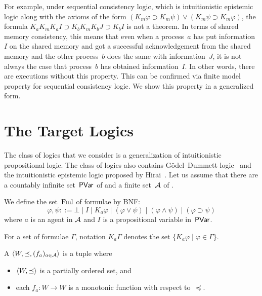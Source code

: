  For example,
 under {sequential consistency logic}, which is intuitionistic epistemic
 logic along with the axioms of the form
 $(K_m\varphi\supset K_m\psi) \vee (K_m\psi\supset K_m\varphi)$,
 the formula $K_aK_mK_aI \supset K_bK_mK_bJ\supset K_bI$ is not a
 theorem.
 In terms of shared memory consistency, this means that even when a
 process~$a$ has put information~$I$ on the shared memory and got a
 successful acknowledgement from the shared memory and the other
 process~$b$ does the same with information~$J$, it is not always the
 case that process~$b$ has obtained information~$I$\kern -2pt.
 In other words, there are executions without this property.
 This can be confirmed via
 finite model property for sequential consistency logic.
 We show this property in a generalized form.

  \section{The Target Logics}
  \label{logic}

  The class of logics that we consider is a generalization of
  intuitionistic propositional logic.
  The class of logics also contains G\"{o}del--Dummett logic~\cite{dummett59}
  and the intuitionistic epistemic logic proposed by
  Hirai~\cite{hirailpar}.
  Let us assume that
  there are a countably infinite set~$\mathsf{PVar}$ of  and a
  finite set~$\mathcal A$ of .

  \begin{definition}
   We define the set~$\mathsf{\operatorname{Fml}}$ of formulae by BNF:
   \[
   \varphi,\psi ::= \bot\mid I\mid K_a\varphi\mid (\varphi\vee\psi)\mid
   (\varphi\land\psi)\mid (\varphi\supset\psi)
   \]
   where $a$ is an agent in $\mathcal A$
   and $I$ is a propositional variable in~$\mathsf{PVar}$.
  \end{definition}

  For a set of formulae $\Gamma\!$, notation $K_a\Gamma$ denotes the set
  $\{K_a\varphi\mid\varphi\in\Gamma\}$\enspace.

  \begin{definition}
   A  $\langle{W,\preceq,(f_a)_{a\in \mathcal A}}\rangle$ is a tuple where
   \begin{itemize}
    \item $\langle{W,\preceq}\rangle$ is a partially ordered set, and
    \item each $f_a\colon W\rightarrow W$ is a monotonic function with
	  respect to~$\preceq$.
   \end{itemize}
  \end{definition}


